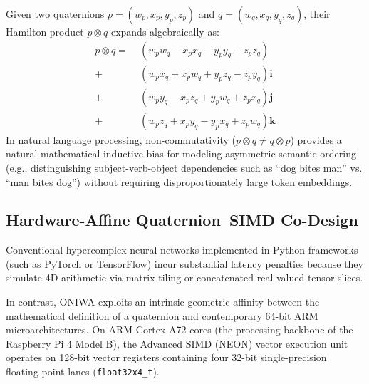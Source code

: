 \documentclass[10pt,twocolumn,letterpaper]{article}
\begin{document}
Given two quaternions $p = (w_p, x_p, y_p, z_p)$ and $q = (w_q, x_q, y_q, z_q)$, their Hamilton product $p \otimes q$ expands algebraically as:
\begin{equation}
\begin{aligned}
p \otimes q = \;& (w_p w_q - x_p x_q - y_p y_q - z_p z_q) \\
+\; & (w_p x_q + x_p w_q + y_p z_q - z_p y_q)\mathbf{i} \\
+\; & (w_p y_q - x_p z_q + y_p w_q + z_p x_q)\mathbf{j} \\
+\; & (w_p z_q + x_p y_q - y_p x_q + z_p w_q)\mathbf{k}
\end{aligned}
\label{eq:hamilton}
\end{equation}
In natural language processing, non-commutativity ($p \otimes q \neq q \otimes p$) provides a natural mathematical inductive bias for modeling asymmetric semantic ordering (e.g., distinguishing subject-verb-object dependencies such as ``dog bites man'' vs. ``man bites dog'') without requiring disproportionately large token embeddings.

\subsection{Hardware-Affine Quaternion--SIMD Co-Design}
Conventional hypercomplex neural networks implemented in Python frameworks (such as PyTorch or TensorFlow) incur substantial latency penalties because they simulate 4D arithmetic via matrix tiling or concatenated real-valued tensor slices. 

In contrast, ONIWA exploits an intrinsic geometric affinity between the mathematical definition of a quaternion and contemporary 64-bit ARM microarchitectures. On ARM Cortex-A72 cores (the processing backbone of the Raspberry Pi 4 Model B), the Advanced SIMD (NEON) vector execution unit operates on 128-bit vector registers containing four 32-bit single-precision floating-point lanes (\texttt{float32x4\_t}). 
\end{document}
